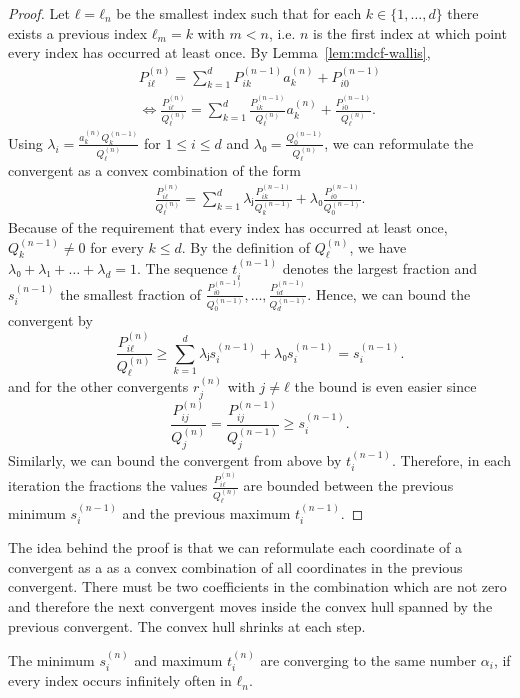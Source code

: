 \begin{proof}
  Let $ℓ = ℓ_n$ be the smallest index such that for each $k ∈ \{1, …, d\}$
  there exists a previous index $ℓ_m = k$ with $m < n$,
  i.e. $n$ is the first index at which point every index has occurred at least once.
  By Lemma~\ref{lem:mdcf-wallis},
  \begin{align*}
    P_{iℓ}^{(n)} = \sum_{k = 1}^d P_{ik}^{(n-1)} a_k^{(n)} + P_{i0}^{(n-1)} \\
    \iff
    \frac{P_{iℓ}^{(n)}}{Q_{ℓ}^{(n)}} = \sum_{k = 1}^d \frac{P_{ik}^{(n-1)}}{Q_ℓ^{(n)}} a_k^{(n)} + \frac{P_{i0}^{(n-1)}}{Q_ℓ^{(n)}}.
  \end{align*}
  Using $λ_i = \frac{a_k^{(n)} Q_k^{(n-1)}}{Q_ℓ^{(n)}}$ for $1 ≤ i ≤ d$ and $λ₀ = \frac{Q_0^{(n-1)}}{Q_ℓ^{(n)}}$,
  we can reformulate the convergent as a convex combination of the form
  \begin{align*}
    \frac{P_{iℓ}^{(n)}}{Q_{ℓ}^{(n)}} = \sum_{k = 1}^d λⱼ \frac{P_{ik}^{(n-1)}}{Q_k^{(n-1)}} + λ₀ \frac{P_{i0}^{(n-1)}}{Q_0^{(n-1)}}.
  \end{align*}
  Because of the requirement that every index has occurred at least once,
  $Q_k^{(n-1)} ≠ 0$ for every $k ≤ d$.
  By the definition of $Q_ℓ^{(n)}$, we have $λ₀ + λ₁ + \dots + λ_d = 1$.
  The sequence $t_i^{(n-1)}$ denotes the largest fraction and $s_i^{(n-1)}$ the smallest
  fraction of $\frac{P_{i0}^{(n-1)}}{Q_0^{(n-1)}}, …, \frac{P_{id}^{(n-1)}}{Q_d^{(n-1)}}$.
  Hence, we can bound the convergent by
  \[
    \frac{P_{iℓ}^{(n)}}{Q_{ℓ}^{(n)}} ≥ \sum_{k=1}^d λⱼ s_i^{(n-1)} + λ₀ s_i^{(n-1)} = s_i^{(n-1)}.
  \]
  and for the other convergents $r_j^{(n)}$ with $j ≠ ℓ$ the bound is even easier since
  \[
    \frac{P_{ij}^{(n)}}{Q_j^{(n)}} = \frac{P_{ij}^{(n-1)}}{Q_j^{(n-1)}} ≥ s_i^{(n-1)}.
  \]
  Similarly, we can bound the convergent from above by $t_i^{(n-1)}$.
  Therefore, in each iteration the fractions the values $\frac{P_{iℓ}^{(n)}}{Q_ℓ^{(n)}}$ are
  bounded between the previous minimum $s_i^{(n-1)}$ and the previous maximum
  $t_i^{(n-1)}$.
\end{proof}

The idea behind the proof is that we can reformulate each coordinate of a
convergent as a as a convex combination of all coordinates in the previous
convergent.
There must be two coefficients in the combination which are not zero
and therefore the next convergent moves inside the convex hull spanned by the previous convergent.
The convex hull shrinks at each step.

\begin{lemma}
  The minimum $s_i^{(n)}$ and maximum $t_i^{(n)}$ are converging to the same
  number $α_i$, if every index occurs infinitely often in $ℓ_n$.
\end{lemma}

